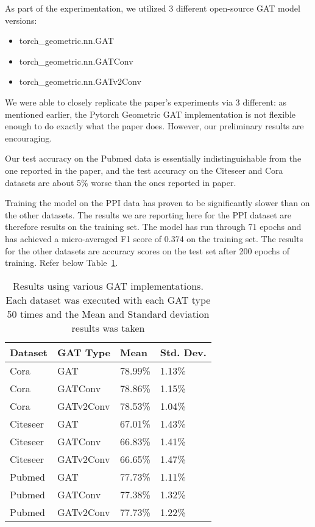 As part of the experimentation, we utilized 3 different open-source GAT model versions:
\begin{itemize}
    \item torch\_geometric.nn.GAT
    \item torch\_geometric.nn.GATConv
    \item torch\_geometric.nn.GATv2Conv
\end{itemize}

We were able to closely replicate the paper's
experiments via 3 different: as mentioned earlier, the Pytorch Geometric GAT implementation is
not flexible enough to do exactly what the paper does.
However, our preliminary results are encouraging.

Our test accuracy on the Pubmed data is essentially
indistinguishable from the one reported in the paper, and the test accuracy on
the Citeseer and Cora datasets are about 5\% worse than the ones reported in
paper.

Training the model on the PPI data has proven to be significantly slower than on the other datasets.
The results we are reporting here for the PPI dataset are therefore results on the training set.
The model has run through 71 epochs and has achieved a micro-averaged F1 score of 0.374 on the training set.
The results for the other datasets are accuracy scores on the test set after 200 epochs of training.
Refer below Table~\ref{tab:results-table}.

\begin{table}
    \centering
    \begin{tabular}{@{}llll@{}}
        \toprule
        \textbf{Dataset} & \textbf{GAT Type} & \textbf{Mean} & \textbf{Std. Dev.}\\
        \midrule
        Cora             &  {GAT}            &  {78.99}\%      & {1.13}\%             \\
        Cora             &  {GATConv}        &  {78.86}\%      & {1.15}\%             \\
        Cora             &  {GATv2Conv}      &  {78.53}\%      & {1.04}\%             \\
        Citeseer         &  {GAT}            &  {67.01}\%      & {1.43}\%             \\
        Citeseer         &  {GATConv}        &  {66.83}\%      & {1.41}\%             \\
        Citeseer         &  {GATv2Conv}      &  {66.65}\%      & {1.47}\%             \\
        Pubmed           &  {GAT}            &  {77.73}\%      & {1.11}\%             \\
        Pubmed           &  {GATConv}        &  {77.38}\%      & {1.32}\%             \\
        Pubmed           &  {GATv2Conv}      &  {77.73}\%      & {1.22}\%             \\
        \bottomrule

    \end{tabular}
    \caption{Results using various GAT implementations. Each dataset was executed with each GAT type 50 times
    and the Mean and Standard deviation results was taken}
    \label{tab:results-table}
\end{table}

